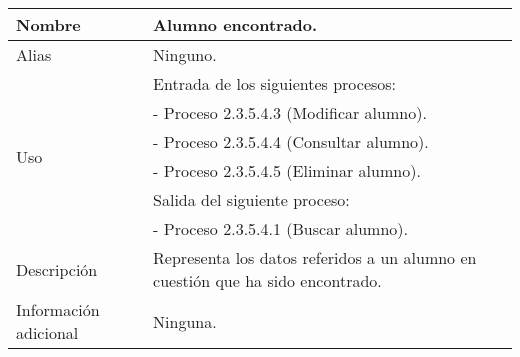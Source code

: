 \begin{center}
  \begin{tabular}{| l | p{9cm} |}
    \hline
    Nombre & \textbf{Alumno encontrado}.\\
    \hline
    Alias & Ninguno.\\
    \hline
    \multirow{6}{*}{Uso} & Entrada de los siguientes procesos:\\
                         & - Proceso 2.3.5.4.3 (Modificar alumno).\\
                         & - Proceso 2.3.5.4.4 (Consultar alumno).\\
                         & - Proceso 2.3.5.4.5 (Eliminar alumno).\\
                         & Salida del siguiente proceso:\\
                         & - Proceso 2.3.5.4.1 (Buscar alumno).\\
    \hline
    Descripción & Representa los datos referidos a un alumno
                  en cuestión que ha sido encontrado.\\
    \hline
    Información adicional & Ninguna.\\
    \hline
  \end{tabular}
\end{center}
